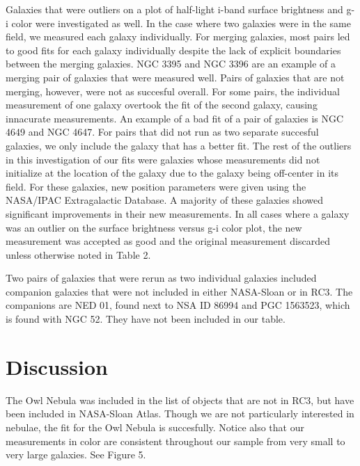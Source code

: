 \documentclass[12pt,preprint,pdftex]{aastex}
\begin{document}
Galaxies that were outliers on a plot of half-light i-band surface brightness and g-i color were investigated as well. In the case where two galaxies were in the same field, we measured each galaxy individually. For merging galaxies, most pairs led to good fits for each galaxy individually despite the lack of explicit boundaries between the merging galaxies. NGC 3395 and NGC 3396 are an example of a merging pair of galaxies that were measured well. Pairs of galaxies that are not merging, however, were not as succesful overall. For some pairs, the individual measurement of one galaxy overtook the fit of the second galaxy, causing innacurate measurements. An example of a bad fit of a pair of galaxies is NGC 4649 and NGC 4647. For pairs that did not run as two separate succesful galaxies, we only include the galaxy that has a better fit. The rest of the outliers in this investigation of our fits were galaxies whose measurements did not initialize at the location of the galaxy due to the galaxy being off-center in its field. For these galaxies, new position parameters were given using the NASA/IPAC Extragalactic Database. A majority of these galaxies showed significant improvements in their new measurements. In all cases where a galaxy was an outlier on the surface brightness versus g-i color plot, the new measurement was accepted as good and the original measurement discarded unless otherwise noted in Table 2.

Two pairs of galaxies that were rerun as two individual galaxies included companion galaxies that were not included in either NASA-Sloan or in RC3. The companions are NED 01, found next to NSA ID 86994 and PGC 1563523, which is found with NGC 52. They have not been included in our table. 



\section{Discussion}

The Owl Nebula was included in the list of objects that are not in RC3, but have been included in NASA-Sloan Atlas. Though we are not particularly interested in nebulae, the fit for the Owl Nebula is succesfully. Notice also that our measurements in color are consistent throughout our sample from very small to very large galaxies. See Figure 5. 
\end{document}
